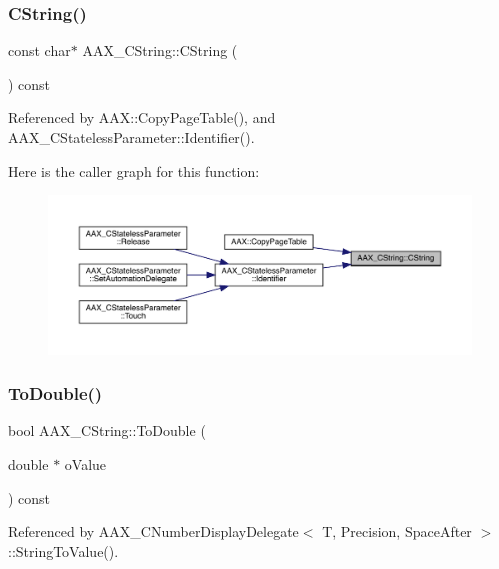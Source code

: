 \mbox{\label{a01573_a325db10aee379f7b23e44edcab47893b}} 
\subsubsection{\texorpdfstring{CString()}{CString()}}
{\footnotesize\ttfamily const char$\ast$ A\+A\+X\+\_\+\+C\+String\+::\+C\+String (\begin{DoxyParamCaption}{ }\end{DoxyParamCaption}) const}



Referenced by A\+A\+X\+::\+Copy\+Page\+Table(), and A\+A\+X\+\_\+\+C\+Stateless\+Parameter\+::\+Identifier().

Here is the caller graph for this function\+:
\nopagebreak
\begin{figure}[H]
\begin{center}
\leavevmode
\includegraphics[width=350pt]{a01573_a325db10aee379f7b23e44edcab47893b_icgraph}
\end{center}
\end{figure}
\mbox{\label{a01573_a6dc9a81e486621fd5e3ea56df137f3d7}} 
\subsubsection{\texorpdfstring{ToDouble()}{ToDouble()}}
{\footnotesize\ttfamily bool A\+A\+X\+\_\+\+C\+String\+::\+To\+Double (\begin{DoxyParamCaption}\item[{double $\ast$}]{o\+Value }\end{DoxyParamCaption}) const}



Referenced by A\+A\+X\+\_\+\+C\+Number\+Display\+Delegate$<$ T, Precision, Space\+After $>$\+::\+String\+To\+Value().

